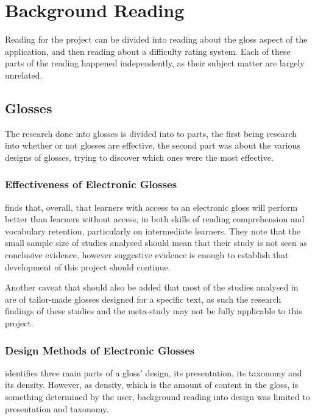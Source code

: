 \chapter{Background Reading}

Reading for the project can be divided into reading about the gloss aspect of the application, and then reading about a difficulty rating system. Each of these parts of the reading happened independently, as their subject matter are largely unrelated.


\section{Glosses}

The research done into glosses is divided into to parts, the first being research into whether or not glosses are effective, the second part was about the various designs of glosses, trying to discover which ones were the most effective.

\subsection{Effectiveness of Electronic Glosses}

\textcite{abraham2008} finds that, overall, that learners with access to an electronic gloss will perform better than learners without access, in both skills of reading comprehension and vocabulary retention, particularly on intermediate learners. They note that the small sample size of studies analysed should mean that their study is not seen as conclusive evidence, however suggestive evidence is enough to establish that development of this project should continue.

Another caveat that should also be added that most of the studies analysed in \textcite{abraham2008} are of tailor-made glosses designed for a specific text, as such the research findings of these studies and the meta-study may not be fully applicable to this project.


\subsection{Design Methods of Electronic Glosses}

\textcite{roby1999} identifies three main parts of a gloss' design, its presentation, its taxonomy and its density. However, as density, which is the amount of content in the gloss, is something determined by the user, background reading into design was limited to presentation and taxonomy. 

